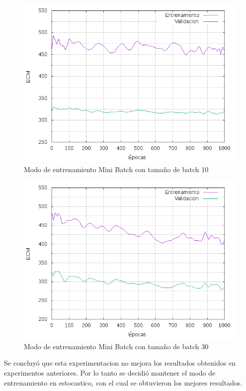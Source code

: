 \begin{figure}[h!]
  \includegraphics[width=125mm]{imagenes/ej1/ex_4-2_red_11-6-6-9-1_errors.png}
  \caption{Modo de entrenamiento Mini Batch con tamaño de batch 10}
\end{figure}

\begin{figure}[h!]
  \includegraphics[width=125mm]{imagenes/ej1/ex_4-3_red_11-6-6-9-1_errors.png}
  \caption{Modo de entrenamiento Mini Batch con tamaño de batch 30}
\end{figure}

Se concluyó que esta experimentacion no mejora los resultados obtenidos en experimentos anteriores. Por lo tanto se decidió
mantener el modo de entrenamiento en estocastico, con el cual se obtuvieron los mejores resultados.


